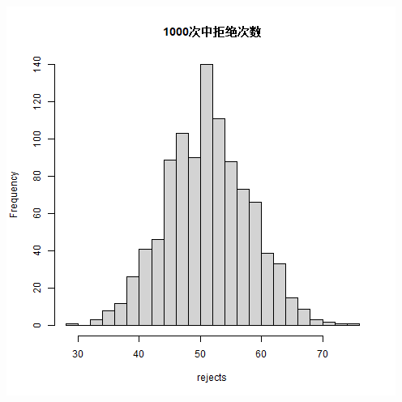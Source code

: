 \documentclass{article}
\begin{document}
\begin{CJK}{UTF8}{gbsn}
\begin{minipage}{0.5\textwidth}
    \includegraphics[scale=0.6]{poisson_check_big.png}
\end{minipage}
\end{CJK}
\end{document}

